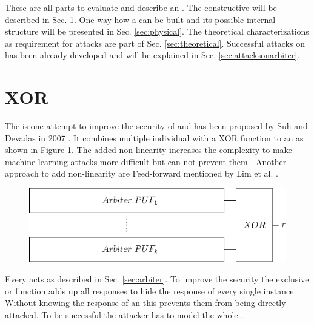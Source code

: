 These are all parts to evaluate and describe an \apuf.
The constructive \xpuf will be described in Sec. \ref{sec:xorarbiterpufs}.
One way how a \apuf can be built and its possible internal structure will be presented in Sec. \ref{sec:physical}.
The theoretical characterizations as requirement for attacks are part of Sec. \ref{sec:theoretical}.
Successful attacks on \apufs has been already developed and will be explained in Sec. \ref{sec:attacksonarbiter}.


\section{\acs{XOR} \apufs}
\label{sec:xorarbiterpufs}

The \xpuf is one attempt to improve the security of \apufs and has been proposed by Suh and Devadas in 2007 \cite{Suh2007PhysicalGeneration}.
It combines multiple individual \apufs with a \acf{XOR} function to an \xpuf as shown in Figure \ref{fig:xorarbiter}.
The added non-linearity increases the complexity to make machine learning attacks more difficult but can not prevent them \cite{Greibach2010OnBifurcation} \cite{Lim2005ExtractingCircuits}.
Another approach to add non-linearity are Feed-forward \apufs mentioned by Lim et al. \cite{Lim2005ExtractingCircuits}.

\begin{figure}[ht]
\centering
\includegraphics[width=1.00\textwidth]{images/xor_arbiter.eps}
\caption{\xpuf}
\label{fig:xorarbiter}
\end{figure}

Every \apuf acts as described in Sec. \ref{sec:arbiter}. 
To improve the security the exclusive or function adds up all responses to hide the response of every single \apuf instance.
Without knowing the response of an \apuf this prevents them from being directly attacked. 
To be successful the attacker has to model the whole \xpuf.

